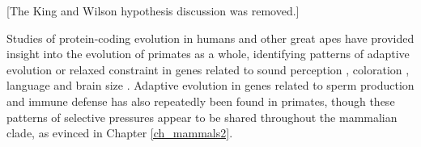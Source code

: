 
[The King and Wilson hypothesis discussion was removed.]

Studies of protein-coding evolution in humans and other great apes
have provided insight into the evolution of primates as a whole,
identifying patterns of adaptive evolution or relaxed constraint in
genes related to sound perception \citep{Clark2003}, coloration
\citep{Mundy2007}, language \citep{Enard2002} and brain size
\citep{Montgomery2011}. Adaptive evolution in genes related to sperm
production \citep{Clark2005} and immune defense \citep{Sawyer2005a}
has also repeatedly been found in primates, though these patterns of
selective pressures appear to be shared throughout the mammalian
clade, as evinced in Chapter \ref{ch_mammals2}.

